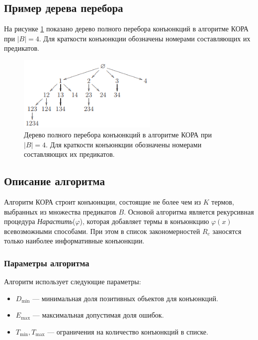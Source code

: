 \subsection{Пример дерева перебора}

На рисунке \ref{fig:kora_tree} показано дерево полного перебора конъюнкций в алгоритме КОРА при \(|B| = 4\). Для краткости конъюнкции обозначены номерами составляющих их предикатов.

\begin{figure}[h]
    \centering
    \includegraphics[width=0.6\textwidth]{images/kora_tree.png}
    \caption{Дерево полного перебора конъюнкций в алгоритме КОРА при \(|B| = 4\). Для краткости конъюнкции обозначены номерами составляющих их предикатов.}
    \label{fig:kora_tree}
\end{figure}

\subsection{Описание алгоритма}

Алгоритм КОРА строит конъюнкции, состоящие не более чем из \(K\) термов, выбранных из множества предикатов \(B\). Основой алгоритма является рекурсивная процедура \textit{Нарастить}(\(\varphi\)), которая добавляет термы в конъюнкцию \(\varphi(x)\) всевозможными способами. При этом в список закономерностей \(R_c\) заносятся только наиболее информативные конъюнкции.

\subsubsection{Параметры алгоритма}

Алгоритм использует следующие параметры:

\begin{itemize}
    \item \(D_{\text{min}}\) — минимальная доля позитивных объектов для конъюнкций.
    \item \(E_{\text{max}}\) — максимальная допустимая доля ошибок.
    \item \(T_{\text{min}}, T_{\text{max}}\) — ограничения на количество конъюнкций в списке.
\end{itemize}

